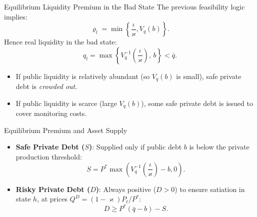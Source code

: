 \documentclass[11pt,aspectratio=169]{beamer}
\begin{document}
\begin{frame}{Equilibrium Liquidity Premium in the Bad State}
\small
The previous feasibility logic implies:
\begin{equation}
\varrho _{l}=\min \left\{ \frac{\iota }{\varkappa },V_{q}(b)\right\}. \label{eq:rho_l}
\end{equation}
Hence real liquidity in the bad state:
\[
q_l
=\max\left\{V_q^{-1}\!\left(\frac{\iota}{\varkappa}\right),\, b\right\}
<\bar q.
\]
\begin{itemize}
  \item If public liquidity is relatively abundant (so $V_q(b)$ is small), safe private debt is \emph{crowded out}.
  \item If public liquidity is scarce (large $V_q(b)$), some safe private debt is issued to cover monitoring costs.
\end{itemize}
\end{frame}

\begin{frame}{Equilibrium Premium and Asset Supply}
\small
\begin{itemize}
    \item \textbf{Safe Private Debt ($S$)}: Supplied only if public debt $b$ is below the private production threshold:
    \begin{equation}
    S=P^{\ast }\max \left( V_{q}^{-1}\left( \frac{\iota }{\varkappa }\right) -b, 0 \right). \label{eq2}
    \end{equation}
    \item \textbf{Risky Private Debt ($D$)}: Always positive ($D>0$) to ensure satiation in state $h$, at prices $Q^{D}=\left( 1-\varkappa \right) P_{t}/P^{\ast }$:
    \begin{equation}
    D \geq P^{\ast }(\bar{q}-b)-S. \label{eq3}
    \end{equation}
\end{itemize}
\end{frame}
\end{document}
